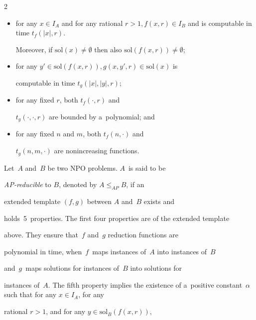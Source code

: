 \begin{multicols}{2}
\begin{itemize}
\item for any $x \in I_{A}$ and for any rational $r >


1,f(x,r)$\linebreak $\in I_{B}$ and is computable in time $t_{f}(|x|,r)$.





Moreover, if $\mathrm{sol}\left(x\right) \neq \emptyset$ then also $\mathrm{sol}\left(f(x,r)\right) \neq


\emptyset$;


\item for any $y' \in \mathrm{sol}\left(f(x,r)\right), g(x,y',r) \in \mathrm{sol}\left(x\right)$ is


computable in time $t_{g}(|x|,|y|,r)$;


\item for any fixed $r$, both $t_{f}(\cdot,r)$ and


$t_{g}(\cdot,\cdot,r)$ are bounded by a~polynomial; and


\item for any fixed $n$ and $m$, both $t_{f}(n,\cdot)$ and


$t_{g}(n,m,\cdot)$ are nonincreasing functions.


\end{itemize}





\smallskip





Let~$A$ and~$B$ be two {NPO} problems. $A$~is said to be


\textit{AP-reducible} to $B$, denoted by $A\leq_{AP}B$, if an


extended template $(f,g)$ between $A$ and~$B$ exists and


holds~5~properties. The first four properties are of the extended template


above. They ensure that~$f$ and~$g$ reduction functions are


polynomial in time, when~$f$~maps instances of~$A$ into instances of~$B$


and~$g$~maps solutions for instances of~$B$ into solutions for


instances of~$A$. The fifth property implies the existence of a~positive constant~$\alpha$ such that for any $x \in I_{A}$, for any


rational $r > 1$, and for any $y \in \mathrm{sol}_{B}(f(x,r))$,



\end{multicols}
